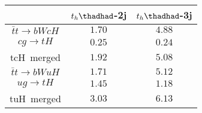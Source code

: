 
\centering
\begin{tabular}{|c|c|c|} \toprule\toprule
& $t_{h}\thadhad$-2j & $t_{h}\thadhad$-3j\\\midrule
$\bar{t}t\to bWcH$ & $1.70$ & $4.88$ \\
$cg\to tH$ &  $0.25$        & $0.24$ \\
tcH~merged &  $1.92$        & $5.08$  \\
$\bar{t}t\to bWuH$ & $1.71$ & $5.12$   \\
$ug\to tH$ & $1.45$         & $1.18$   \\
tuH~merged & $3.03$         & $6.13$   \\
\bottomrule\bottomrule
\end{tabular}
